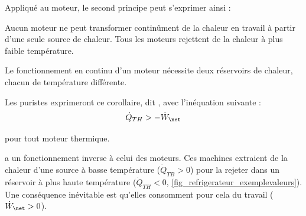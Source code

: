 \begin{description}
{			Appliqué au moteur, le second principe peut s’exprimer ainsi :

			\begin{trucimportant}
			Aucun moteur ne peut transformer continûment\linebreak
			de la chaleur en travail\linebreak
			à partir d’une seule source de chaleur.\linebreak
			Tous les moteurs rejettent de la chaleur à plus faible température.\linebreak
			\end{trucimportant}
			\begin{trucimportant}
			Le fonctionnement en continu d’un moteur\linebreak
			nécessite deux réservoirs de chaleur, chacun de température différente.
			\end{trucimportant}

			Les puristes exprimeront ce corollaire, dit , avec l’inéquation suivante :
			\begin{equation}
				\dot Q_{TH} > -\dot W_\net
			\end{equation}
			\begin{equationterms}
				\item pour tout moteur thermique.
			\end{equationterms}

		}%

		\clearfloats{}
		\item[Un réfrigérateur, un climatiseur ou une pompe à chaleur]{a un fonctionnement inverse à celui des moteurs. Ces machines extraient de la chaleur d’une source à basse température ($\dot Q_{TB} > 0$) pour la rejeter dans un réservoir à plus haute température ($\dot Q_{TH} < 0$, \cref{fig_refrigerateur_exemplevaleurs}). Une conséquence inévitable est qu’elles consomment pour cela du travail ($\dot W_\net > 0$).

}
\end{description}
